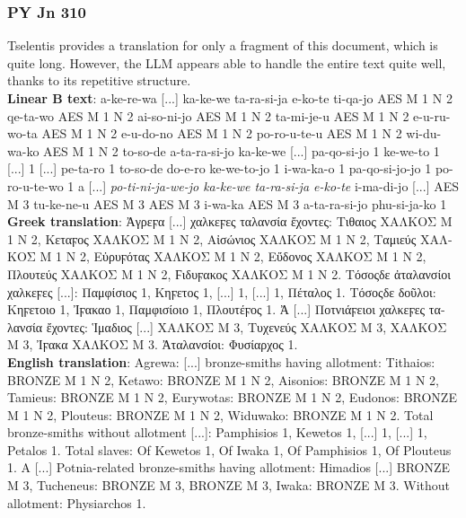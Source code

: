 \subsubsection{PY Jn 310}
Tselentis provides a translation for only a fragment of this document, which is quite long.
However, the LLM appears able to handle the entire text quite well, thanks to its repetitive structure. \\
\textbf{Linear B text}: a-ke-re-wa [...] ka-ke-we ta-ra-si-ja e-ko-te ti-qa-jo AES M 1 N 2 qe-ta-wo AES M 1 N 2 ai-so-ni-jo AES M 1 N 2 ta-mi-je-u AES M 1 N 2 e-u-ru-wo-ta AES M 1 N 2 e-u-do-no AES M 1 N 2 po-ro-u-te-u AES M 1 N 2 wi-du-wa-ko AES M 1 N 2 to-so-de a-ta-ra-si-jo ka-ke-we [...] pa-qo-si-jo 1 ke-we-to 1 [...] 1 [...] pe-ta-ro 1 to-so-de do-e-ro ke-we-to-jo 1 i-wa-ka-o 1 pa-qo-si-jo-jo 1 po-ro-u-te-wo 1 a [...] \textit{po-ti-ni-ja-we-jo ka-ke-we ta-ra-si-ja e-ko-te} i-ma-di-jo [...] AES M 3 tu-ke-ne-u AES M 3 AES M 3 i-wa-ka AES M 3 a-ta-ra-si-jo phu-si-ja-ko 1 \\
\textbf{Greek translation}: \textgreek{Ἀγρεϝα [...] χαλκεϝες ταλανσία ἔχοντες: Τιθαιος ΧΑΛΚΟΣ M 1 N 2, Κεταϝος ΧΑΛΚΟΣ M 1 N 2, Αἰσώνιος ΧΑΛΚΟΣ M 1 N 2, Ταμιεύς ΧΑΛΚΟΣ M 1 N 2, Εὐρυϝότας ΧΑΛΚΟΣ M 1 N 2, Εὔδονος ΧΑΛΚΟΣ M 1 N 2, Πλουτεύς ΧΑΛΚΟΣ M 1 N 2, Ϝιδυϝακος ΧΑΛΚΟΣ M 1 N 2. Τόσοςδε ἀταλανσίοι χαλκεϝες [...]: Παμφίσιος 1, Κηϝετος 1, [...] 1, [...] 1, Πέταλος 1. Τόσοςδε δοῦλοι: Κηϝετοιο 1, Ἰϝακαο 1, Παμφισίοιο 1, Πλουτέϝος 1. Ἀ [...] Ποτνιάϝειοι χαλκεϝες ταλανσία ἔχοντες: Ἱμαδιος [...] ΧΑΛΚΟΣ M 3, Τυχενεύς ΧΑΛΚΟΣ M 3, ΧΑΛΚΟΣ M 3, Ἰϝακα ΧΑΛΚΟΣ M 3. Ἀταλανσίοι: Φυσίαρχος 1.} \\
\textbf{English translation}: Agrewa: [...] bronze-smiths having allotment: Tithaios: BRONZE M 1 N 2, Ketawo: BRONZE M 1 N 2, Aisonios: BRONZE M 1 N 2, Tamieus: BRONZE M 1 N 2, Eurywotas: BRONZE M 1 N 2, Eudonos: BRONZE M 1 N 2, Plouteus: BRONZE M 1 N 2, Widuwako: BRONZE M 1 N 2. Total bronze-smiths without allotment [...]: Pamphisios 1, Kewetos 1, [...] 1, [...] 1, Petalos 1. Total slaves: Of Kewetos 1, Of Iwaka 1, Of Pamphisios 1, Of Plouteus 1. A [...] Potnia-related bronze-smiths having allotment: Himadios [...] BRONZE M 3, Tucheneus: BRONZE M 3, BRONZE M 3, Iwaka: BRONZE M 3. Without allotment: Physiarchos 1.

